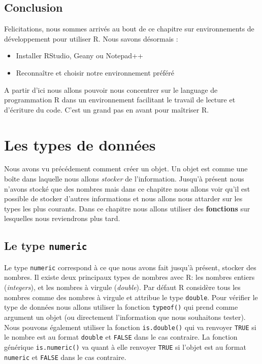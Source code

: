 \documentclass[]{book}
\providecommand{\tightlist}{%
  \setlength{\itemsep}{0pt}\setlength{\parskip}{0pt}}
\theoremstyle{definition}
\theoremstyle{definition}
\theoremstyle{definition}
\theoremstyle{remark}
\begin{document}
\section{Conclusion}\label{conclusion-1}

Felicitations, nous sommes arrivés au bout de ce chapitre sur
environnements de développement pour utiliser R. Nous savons désormais :

\begin{itemize}
\tightlist
\item
  Installer RStudio, Geany ou Notepad++
\item
  Reconnaître et choisir notre environnement préféré
\end{itemize}

A partir d'ici nous allons pouvoir nous concentrer sur le language de
programmation R dans un environnement facilitant le travail de lecture
et d'écriture du code. C'est un grand pas en avant pour maîtriser R.

\hypertarget{dataType1}{\chapter{Les types de données}\label{dataType1}}

Nous avons vu précédement comment créer un objet. Un objet est comme une
boîte dans laquelle nous allons \emph{stocker} de l'information. Jusqu'à
présent nous n'avons stocké que des nombres mais dans ce chapitre nous
allons voir qu'il est possible de stocker d'autres informations et nous
allons nous attarder sur les types les plus courants. Dans ce chapitre
nous allons utiliser des \textbf{fonctions} sur lesquelles nous
reviendrons plus tard.

\section{\texorpdfstring{Le type
\texttt{numeric}}{Le type numeric}}\label{le-type-numeric}

Le type \texttt{numeric} correspond à ce que nous avons fait jusqu'à
présent, stocker des nombres. Il existe deux principaux types de nombres
avec R: les nombres entiers (\emph{integers}), et les nombres à virgule
(\emph{double}). Par défaut R considère tous les nombres comme des
nombres à virgule et attribue le type \texttt{double}. Pour vérifier le
type de données nous allons utiliser la fonction \texttt{typeof()} qui
prend comme argument un objet (ou directement l'information que nous
souhaitons tester). Nous pouvons également utiliser la fonction
\texttt{is.double()} qui va renvoyer \texttt{TRUE} si le nombre est au
format \texttt{double} et \texttt{FALSE} dans le cas contraire. La
fonction générique \texttt{is.numeric()} va quant à elle renvoyer
\texttt{TRUE} si l'objet est au format \texttt{numeric} et
\texttt{FALSE} dans le cas contraire.
\end{document}
